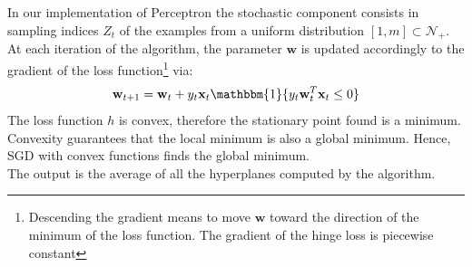 \documentclass{article}
\begin{document}
In our implementation of Perceptron the stochastic component consists in sampling indices $Z_t$ of the examples from a uniform distribution $[1,m] \subset  \mathcal{N_+}$.
At each iteration of the algorithm, the parameter $\textbf{w}$ is updated accordingly to the gradient of the loss function\footnote{Descending the gradient means to move $\textbf{w}$ toward the direction of the minimum of the loss function. The gradient of the hinge loss is piecewise constant} via:
\begin{equation}
    \textbf{w}_{t+1} = \textbf{w}_t + y_t \textbf{x}_t \mathbbm{1}\{y_t \textbf{w}_t^T \textbf{x}_t \leq 0\}
\end{equation}
\noindent The loss function $h$ is convex, therefore the stationary point found is a minimum. Convexity guarantees that the local minimum is also a global minimum. Hence, SGD with convex functions finds the global minimum. \\
The output is the average of all the hyperplanes computed by the algorithm.
\end{document}
